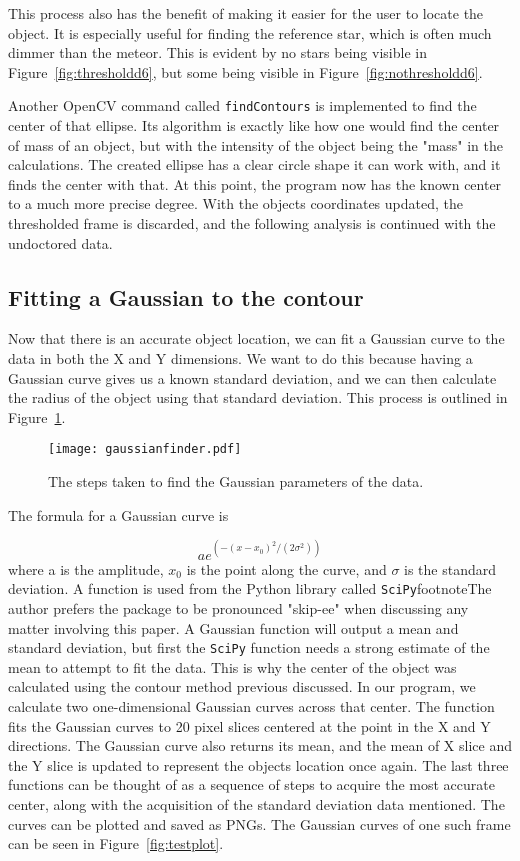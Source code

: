 This process also has the benefit of making it easier for the user to locate the object. It is especially useful for finding the reference star, which is often much dimmer than the meteor. This is evident by no stars being visible in Figure~\ref{fig:thresholdd6}, but some being visible in Figure~\ref{fig:nothresholdd6}.

Another OpenCV command called \texttt{findContours} is implemented to find the center of that ellipse. Its algorithm is exactly like how one would find the center of mass of an object, but with the intensity of the object being the "mass" in the calculations. The created ellipse has a clear circle shape it can work with, and it finds the center with that. At this point, the program now has the known center to a much more precise degree. With the objects coordinates updated, the thresholded frame is discarded, and the following analysis is continued with the undoctored data. 


\subsection{Fitting a Gaussian to the contour}
Now that there is an accurate object location, we can fit a Gaussian curve to the data in both the X and Y dimensions. We want to do this because having a Gaussian curve gives us a known standard deviation, and we can then calculate the radius of the object using that standard deviation. This process is outlined in Figure~\ref{fig:gaussianfinder}.

\begin{figure}[h!]
	\centering
	\texttt{[image: gaussianfinder.pdf]}
	\caption{The steps taken to find the Gaussian parameters of the data.}
	\label{fig:gaussianfinder}
\end{figure}

The formula for a Gaussian curve is 

\begin{equation}
	ae^{(-(x-x_0)^2/(2\sigma^2))}
\end{equation}
where a is the amplitude, $x_0$ is the point along the curve, and $\sigma$ is the standard deviation. A function is used from the Python library called \texttt{SciPy}footnote{The author prefers the package to be pronounced "skip-ee" when discussing any matter involving this paper}. A Gaussian function will output a mean and standard deviation, but first the \texttt{SciPy} function needs a strong estimate of the mean to attempt to fit the data. This is why the center of the object was calculated using the contour method previous discussed. In our program, we calculate two one-dimensional Gaussian curves across that center. The function fits the Gaussian curves to 20 pixel slices centered at the point in the X and Y directions. The Gaussian curve also returns its mean, and the mean of X slice and the Y slice is updated to represent the objects location once again. The last three functions can be thought of as a sequence of steps to acquire the most accurate center, along with the acquisition of the standard deviation data mentioned. The curves can be plotted and saved as PNGs. The Gaussian curves of one such frame can be  seen in Figure~\ref{fig:testplot}.

